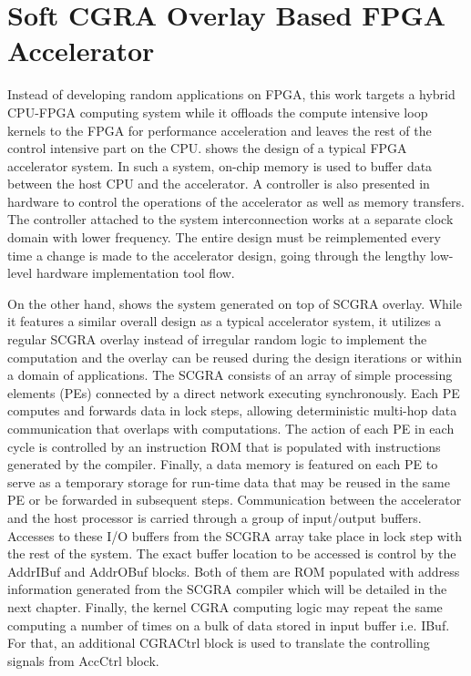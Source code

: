 \chapter{Soft CGRA Overlay Based FPGA Accelerator} \label{chapter:overlay}
Instead of developing random applications on FPGA, this work targets a hybrid CPU-FPGA computing system while it offloads the compute intensive loop kernels to the FPGA for performance acceleration and leaves the rest of the control intensive part on the CPU.  shows the design of a typical FPGA accelerator system. In such a system, on-chip memory is used to buffer data between the host CPU and the accelerator. A controller is also presented in hardware to control the operations of the accelerator as well as memory transfers. The controller attached to the system interconnection works at a separate clock domain with lower frequency. The entire design must be reimplemented every time a change is made to the accelerator design, going through the lengthy low-level hardware implementation tool flow. 

On the other hand,  shows the system generated on top of SCGRA overlay. While it features a similar overall design as a typical accelerator system, it utilizes a regular SCGRA overlay instead of irregular random logic to implement the computation and the overlay can be reused during the design iterations or within a domain of applications. The SCGRA consists of an array of simple processing elements (PEs) connected by a direct network executing synchronously. Each PE computes and forwards data in lock steps, allowing deterministic multi-hop data communication that overlaps with computations. The action of each PE in each cycle is controlled by an instruction ROM that is populated with instructions generated by the compiler. Finally, a data memory is featured on each PE to serve as a temporary storage for run-time data that may be reused in the same PE or be forwarded in subsequent steps. Communication between the accelerator and the host processor is carried through a group of input/output buffers. Accesses to these I/O buffers from the SCGRA array take place in lock step with the rest of the system. The exact buffer location to be accessed is control by the AddrIBuf and AddrOBuf blocks. Both of them are ROM populated with address information generated from the SCGRA compiler which will be detailed in the next chapter. Finally, the kernel CGRA computing logic may repeat the same computing a number of times on a bulk of data stored in input buffer i.e. IBuf. For that, an additional CGRACtrl block is used to translate the controlling signals from AccCtrl block.   

